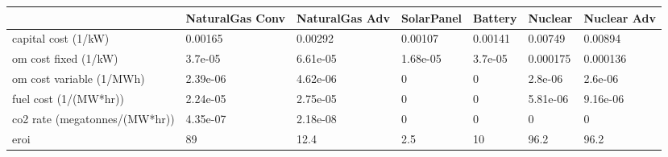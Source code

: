 \begin{tabular}{lllllll}
\toprule
 & NaturalGas Conv & NaturalGas Adv & SolarPanel & Battery & Nuclear & Nuclear Adv \\
\midrule
capital cost (1/kW) \cite{national_renewable_energy_laboratory_2023_2023}& 0.00165 & 0.00292 & 0.00107 & 0.00141 & 0.00749 & 0.00894 \\
om cost fixed (1/kW) \cite{national_renewable_energy_laboratory_2023_2023}& 3.7e-05 & 6.61e-05 & 1.68e-05 & 3.7e-05 & 0.000175 & 0.000136 \\
om cost variable (1/MWh) \cite{national_renewable_energy_laboratory_2023_2023}& 2.39e-06 & 4.62e-06 & 0 & 0 & 2.8e-06 & 2.6e-06 \\
fuel cost (1/(MW*hr))  \cite{national_renewable_energy_laboratory_2023_2023,desai_nuclear_2020}& 2.24e-05 & 2.75e-05 & 0 & 0 & 5.81e-06 & 9.16e-06 \\
co2 rate (megatonnes/(MW*hr)) \cite{energy_information_administration_how_2024}& 4.35e-07 & 2.18e-08 & 0 & 0 & 0 & 0 \\
eroi \cite{walmsley_energy_2018} & 89 & 12.4 & 2.5 & 10 & 96.2 & 96.2 \\
\bottomrule
\end{tabular}
